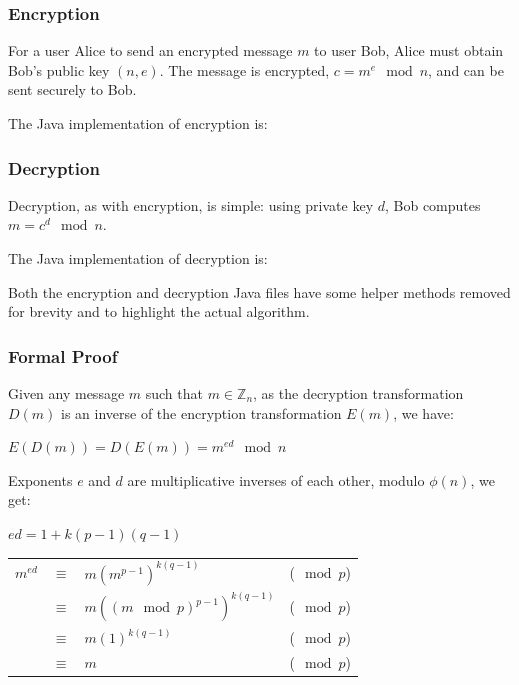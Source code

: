     \subsubsection{Encryption}
    
    For a user Alice to send an encrypted message $m$ to user Bob, Alice must obtain Bob's public key $(n,e)$. The message is encrypted, $c = m^e \mod n$, and can be sent securely to Bob.
    
    The Java implementation of encryption is:
    
    
    \subsubsection{Decryption}
    
    Decryption, as with encryption, is simple: using private key $d$, Bob computes $m = c^d \mod {n}$.
    
    The Java implementation of decryption is:
    
    
    Both the encryption and decryption Java files have some helper methods removed for brevity and to highlight the actual algorithm.
    
    \subsubsection{Formal Proof}
    
    Given any message $m$ such that $m \in \mathbb{Z}_n$, as the decryption transformation $D(m)$ is an inverse of the encryption transformation $E(m)$, we have: 
    \begin{center}
      $E(D(m)) = D(E(m)) = m^{ed} \mod n$
    \end{center}
    
    Exponents $e$ and $d$ are multiplicative inverses of each other, modulo $\phi(n)$, we get:
    \begin{center}
      $ed = 1 + k(p-1)(q-1)$
    \end{center}
    
    \begin{center}
      \begin{tabular}{ l l l l }
        $m^{ed}$ & $\equiv$ & $m(m^{p-1})^{k(q-1)}$ & ($\mod p$) \\
         & $\equiv$ & $m((m \mod p)^{p-1})^{k(q-1)}$ & ($\mod p$) \\
         & $\equiv$ & $m(1)^{k(q-1)}$ & ($\mod p$) \\
         & $\equiv$ & $m$ & ($\mod p$)
      \end{tabular}
    \end{center}
    
